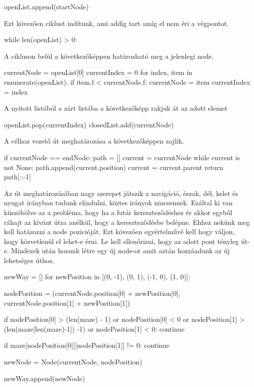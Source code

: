 \begin{python}
    openList.append(startNode)
\end{python}

Ezt kövezően ciklust indítunk, ami addig tart amíg el nem éri a végpontot.

\begin{python}
while len(openList) > 0:
\end{python}

A cikluson belül a következőképpen határozható meg a jelenlegi node.

\begin{python}
currentNode = openList[0]
currentIndex = 0
for index, item in enumerate(openList):
       if item.f < currentNode.f:
          currentNode = item
          currentIndex = index
                
\end{python}      

A nyitott listából a zárt listába a következőképp rakjuk át az adott elemet
          
\begin{python}
openList.pop(currentIndex)
closedList.add(currentNode)
\end{python}

A célhoz vezető út meghatározása a következőképpen zajlik.

\begin{python}
if currentNode == endNode:
    path = []
    current = currentNode
    while current is not None:
        path.append(current.position)
        current = current.parent
    return path[::-1]
\end{python}

Az út meghatározásában nagy szerepet játszik a navigáció, észak, dél, kelet és nyugat irányban tudunk elindulni, köztes irányok nincsennek. Ezáltal ki van küszöbölve az a probléma, hogy ha a futár kereszteződéshez ér akkor egyből ráhajt az kívánt útra anélkül, hogy a kereszteződésbe belépne. Ehhez nekünk meg kell hatázozni a node pozicióját. Ezt kövezően egyértelművé kell hogy váljon, hogy közvetlenül el lehet-e érni. Le kell ellenőrizni, hogy az adott pont tényleg út-e. Mindezek után hozunk létre egy új node-ot amit aztán hozzáadunk az új lehetséges úthoz.

\begin{python}
newWay = []                
for newPosition in [(0, -1), (0, 1), (-1, 0), (1, 0)]:

    nodePosition = (currentNode.position[0] + newPosition[0], 
            		currentNode.position[1] + newPosition[1])

    if nodePosition[0] > (len(maze) - 1) or 
    nodePosition[0] < 0 or 
    nodePosition[1] > (len(maze[len(maze)-1]) -1) or 
    nodePosition[1] < 0:
        continue

    if maze[nodePosition[0]][nodePosition[1]] != 0:
        continue

    newNode = Node(currentNode, nodePosition)

    newWay.append(newNode)
\end{python}

